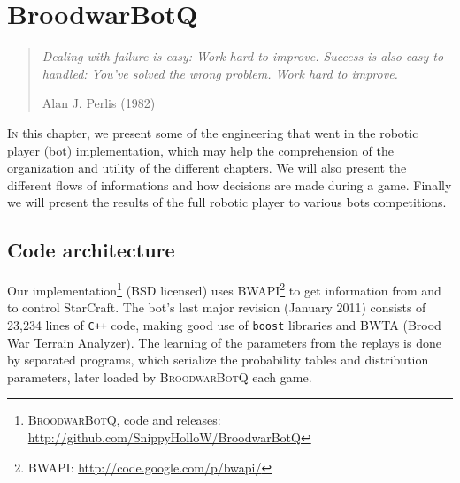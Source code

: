 \chapter{BroodwarBotQ}%
\label{chapter:bot}



\begin{quotation}
\textit{Dealing with failure is easy: Work hard to improve. Success is also easy to handled: You've solved the wrong problem. Work hard to improve.}\\
\begin{flushright}Alan J. Perlis (1982)\end{flushright}
\end{quotation}

\lettrine{I}{n} this chapter, we present some of the engineering that went in the robotic player (bot) implementation, which may help the comprehension of the organization and utility of the different chapters. We will also present the different flows of informations and how decisions are made during a game. Finally we will present the results of the full robotic player to various bots competitions.




\section{Code architecture}

\label{sec:codearchitecture}

Our implementation\footnote{\textsc{BroodwarBotQ}, code and releases: \url{http://github.com/SnippyHolloW/BroodwarBotQ}} (BSD licensed) uses BWAPI\footnote{BWAPI: \url{http://code.google.com/p/bwapi/}} to get information from and to control StarCraft. The bot's last major revision (January 2011) consists of 23,234 lines of \texttt{C++} code, making good use of \texttt{boost} libraries and BWTA (Brood War Terrain Analyzer). The learning of the parameters from the replays is done by separated programs, which serialize the probability tables and distribution parameters, later loaded by \textsc{BroodwarBotQ} each game.


